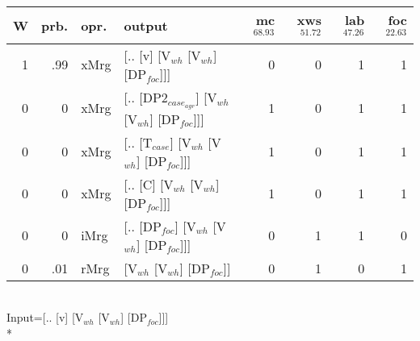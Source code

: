 \begin{tabularx}{\linewidth}{rrlXrrrr}
\hline
   W &   prb. & opr.   & output                                     &   mc$^{68.93}$ &   xws$^{51.72}$ &   lab$^{47.26}$ &   foc$^{22.63}$ \\
\hline
   1 &   .99 & xMrg & [.. [v] [V$_{wh}$ [V$_{wh}$] [DP$_{foc}$]]]            &            0 &             0 &             1 &             1 \\
   0 &   0 & xMrg & [.. [DP2$_{case_{agr}}$] [V$_{wh}$ [V$_{wh}$] [DP$_{foc}$]]] &            1 &             0 &             1 &             1 \\
   0 &   0 & xMrg & [.. [T$_{case}$] [V$_{wh}$ [V$_{wh}$] [DP$_{foc}$]]]       &            1 &             0 &             1 &             1 \\
   0 &   0 & xMrg & [.. [C] [V$_{wh}$ [V$_{wh}$] [DP$_{foc}$]]]            &            1 &             0 &             1 &             1 \\
   0 &   0 & iMrg & [.. [DP$_{foc}$] [V$_{wh}$ [V$_{wh}$] [DP$_{foc}$]]]       &            0 &             1 &             1 &             0 \\
   0 &   .01 & rMrg & [V$_{wh}$ [V$_{wh}$] [DP$_{foc}$]]                     &            0 &             1 &             0 &             1 \\
\hline
\end{tabularx}\endgroup\\
\begingroup\scriptsize Input=[.. [v] [V$_{wh}$ [V$_{wh}$] [DP$_{foc}$]]]\\*
